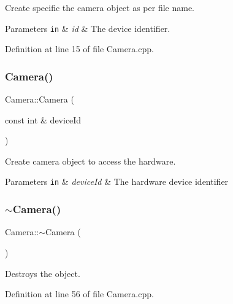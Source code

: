 Create specific the camera object as per file name. 


\begin{DoxyParams}[1]{Parameters}
\mbox{\tt in}  & {\em id} & The device identifier. \\
\hline
\end{DoxyParams}


Definition at line 15 of file Camera.\+cpp.

\mbox{\label{class_camera_a06c600e443fd9222c1fd4c13b9bdfd09}} 
\subsubsection{\texorpdfstring{Camera()}{Camera()}\hspace{0.1cm}{\footnotesize\ttfamily [3/3]}}
{\footnotesize\ttfamily Camera\+::\+Camera (\begin{DoxyParamCaption}\item[{const int \&}]{device\+Id }\end{DoxyParamCaption})\hspace{0.3cm}{\ttfamily [explicit]}}



Create camera object to access the hardware. 


\begin{DoxyParams}[1]{Parameters}
\mbox{\tt in}  & {\em device\+Id} & The hardware device identifier \\
\hline
\end{DoxyParams}
\mbox{\label{class_camera_ad1897942d0ccf91052386388a497349f}} 
\subsubsection{\texorpdfstring{$\sim$\+Camera()}{~Camera()}}
{\footnotesize\ttfamily Camera\+::$\sim$\+Camera (\begin{DoxyParamCaption}{ }\end{DoxyParamCaption})}



Destroys the object. 



Definition at line 56 of file Camera.\+cpp.




